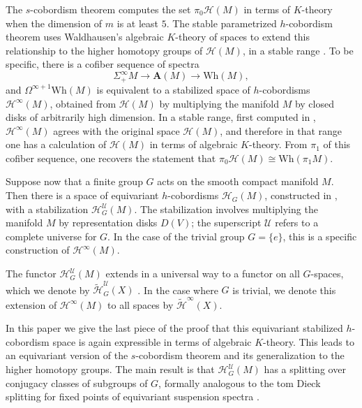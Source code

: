 \documentclass[11pt]{amsart}
\theoremstyle{definition}
\numberwithin{equation}{section}
\numberwithin{figure}{section}
\newcommand{\mc}{\mathcal}
\newcommand{\Wh}{\mathrm{Wh}}
\newcommand{\A}{\textbf{A}}
\begin{document}
The $s$-cobordism theorem computes the set $\pi_0\mathcal{H}(M)$ in terms of $K$-theory when the dimension of $m$ is at least $5$. The stable parametrized $h$-cobordism theorem \cite{wjr} uses Waldhausen's algebraic $K$-theory of spaces to extend this relationship to the higher homotopy groups of $\mathcal{H}(M)$, in a stable range \cite{ww}. To be specific, there is a cofiber sequence of spectra
\[ \Sigma^\infty_+ M \to \A(M) \to \Wh(M), \]
and $\Omega^{\infty+1}  \Wh(M)$ is equivalent to a stabilized space of $h$-cobordisms $\mathcal{H}^\infty(M)$, obtained from $\mathcal{H}(M)$ by multiplying the manifold $M$ by closed disks of arbitrarily high dimension. In a stable range, first computed in \cite{igusa}, $\mathcal{H}^\infty(M)$ agrees with the original space $\mathcal{H}(M)$, and therefore in that range one has a calculation of $\mathcal{H}(M)$ in terms of algebraic $K$-theory. From $\pi_1$ of this cofiber sequence, one recovers the statement that $\pi_0\mathcal{H}(M) \cong \Wh(\pi_1M)$.

Suppose now that a finite group $G$ acts on the smooth compact manifold $M$. Then there is a space of equivariant $h$-cobordisms $\mathcal{H}_G(M)$, constructed in \cite{GIMM1}, with a stabilization $\mathcal{H}_G^\mathcal{U}(M)$. The stabilization involves multiplying the manifold $M$ by representation disks $D(V)$; the superscript $\mathcal U$ refers to a complete universe for $G$. In the case of the trivial group $G = \{e\}$, this is a specific construction of  $\mathcal{H}^\infty(M)$.

The functor $\mathcal{H}_G^\mathcal{U}(M)$ extends in a universal way to a functor on all $G$-spaces, which we denote by $\widetilde{\mc H}_G^\mathcal{U}(X)$ \cite[Thm 7.14]{GIMM1}. In the case where $G$ is trivial, we denote this extension of $\mathcal{H}^\infty(M)$ to all spaces by $\widetilde{\mc H}^\infty(X)$.

In this paper we give the last piece of the proof that this equivariant stabilized $h$-cobordism space is again expressible in terms of algebraic $K$-theory. This leads to an equivariant version of the $s$-cobordism theorem and its generalization to the higher homotopy groups. The main result is that $\mathcal{H}_G^\mathcal{U}(M)$ has a splitting over conjugacy classes of subgroups of $G$, formally analogous to the tom Dieck splitting for fixed points of equivariant suspension spectra \cite{tD}.
\end{document}
